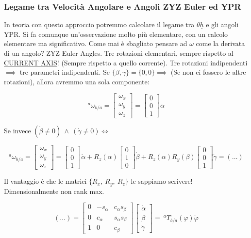 \subsubsection{Legame tra Velocità Angolare e Angoli ZYZ Euler ed YPR}

In teoria con questo approccio potremmo calcolare il legame tra $\theta\underline{h}$ e gli angoli YPR. Si fa comunque un'osservazione molto più elementare, con un calcolo elementare ma significativo. Come mai è sbagliato pensare ad $\omega$ come la derivata di un angolo? ZYZ Euler Angles. Tre rotazioni elementari, sempre rispetto al \underline{CURRENT AXIS}! (Sempre rispetto a quello corrente). Tre rotazioni indipendenti $\implies$ tre parametri indipendenti. Se $\{\beta,\gamma\} = \{0,0\} \implies$ (Se non ci fossero le altre rotazioni), allora avremmo una sola componente:

\[
	^a\omega_{b/a} = \begin{bmatrix}\omega_x\\\omega_y\\\omega_z\end{bmatrix} = \begin{bmatrix}0\\0\\1\end{bmatrix}\dot{\alpha}
\]

Se invece $(\dot{\beta}\neq 0)\ \land\ (\dot{\gamma}\neq 0) \iff$

\[
	^a\omega_{b/a} = \begin{bmatrix}\omega_x\\\omega_y\\\omega_z\end{bmatrix} = \begin{bmatrix}0\\0\\1\end{bmatrix}\dot{\alpha} + R_z(\alpha)\begin{bmatrix}0\\1\\0\end{bmatrix}\dot{\beta} + R_z(\alpha)R_y(\beta)\begin{bmatrix}0\\0\\1\end{bmatrix}\dot{\gamma} = (\dots)
\]

Il vantaggio è che le matrici $\{R_x,\ R_y,\ R_z\}$ le sappiamo scrivere! Dimensionalmente non rank max.

\[
	(\dots) = \begin{bmatrix}0&-s_\alpha&c_\alpha s_\beta\\0&c_\alpha&s_\alpha s_\beta\\1&0&c_\beta\end{bmatrix}\begin{bmatrix}\dot{\alpha}\\\dot{\beta}\\\dot{\gamma}\end{bmatrix} =\ ^aT_{b/a}(\varphi)\dot{\varphi}
\]


